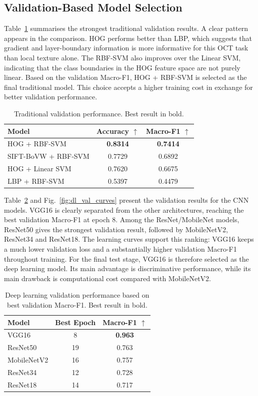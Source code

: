 \documentclass[10pt,twocolumn,letterpaper]{article}
\begin{document}
\subsection{Validation-Based Model Selection}
Table~\ref{tab:trad_val} summarises the strongest traditional validation results. A clear pattern appears in the comparison. HOG performs better than LBP, which suggests that gradient and layer-boundary information is more informative for this OCT task than local texture alone. The RBF-SVM also improves over the Linear SVM, indicating that the class boundaries in the HOG feature space are not purely linear. Based on the validation Macro-F1, HOG + RBF-SVM is selected as the final traditional model. This choice accepts a higher training cost in exchange for better validation performance.

\begin{table}[t]
\centering
\caption{Traditional validation performance. Best result in bold.}
\label{tab:trad_val}
\small
\setlength{\tabcolsep}{5pt}
\begin{tabular}{lcc}
\toprule
Model & Accuracy $\uparrow$ & Macro-F1 $\uparrow$ \\
\midrule
HOG + RBF-SVM & \textbf{0.8314} & \textbf{0.7414} \\
SIFT-BoVW + RBF-SVM & 0.7729 & 0.6892 \\
HOG + Linear SVM & 0.7620 & 0.6675 \\
LBP + RBF-SVM & 0.5397 & 0.4479 \\
\bottomrule
\end{tabular}
\end{table}

Table~\ref{tab:dl_val} and Fig.~\ref{fig:dl_val_curves} present the validation results for the CNN models. VGG16 is clearly separated from the other architectures, reaching the best validation Macro-F1 at epoch 8. Among the ResNet/MobileNet models, ResNet50 gives the strongest validation result, followed by MobileNetV2, ResNet34 and ResNet18. The learning curves support this ranking: VGG16 keeps a much lower validation loss and a substantially higher validation Macro-F1 throughout training. For the final test stage, VGG16 is therefore selected as the deep learning model. Its main advantage is discriminative performance, while its main drawback is computational cost compared with MobileNetV2.

\begin{table}[t]
\centering
\caption{Deep learning validation performance based on best validation Macro-F1. Best result in bold.}
\label{tab:dl_val}
\small
\setlength{\tabcolsep}{6pt}
\begin{tabular}{lcc}
\toprule
Model & Best Epoch & Macro-F1 $\uparrow$ \\
\midrule
VGG16 & 8 & \textbf{0.963} \\
ResNet50 & 19 & 0.763 \\
MobileNetV2 & 16 & 0.757 \\
ResNet34 & 12 & 0.728 \\
ResNet18 & 14 & 0.717 \\
\bottomrule
\end{tabular}
\end{table}
\end{document}
